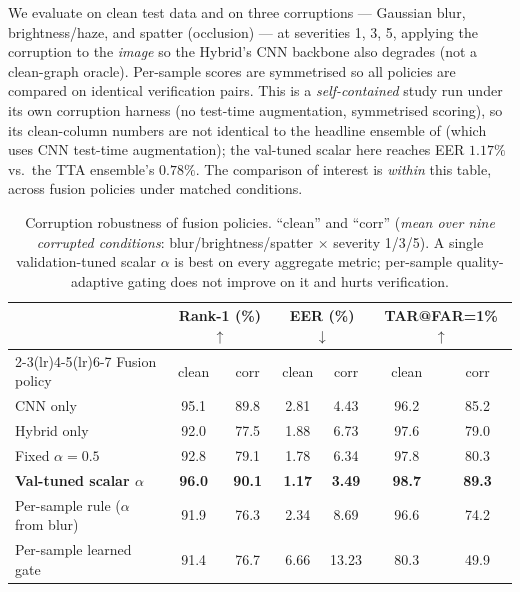 \documentclass[11pt]{article}
\begin{document}
We evaluate on clean test data and on three corruptions --- Gaussian blur,
brightness/haze, and spatter (occlusion) --- at severities 1, 3, 5, applying the corruption
to the \emph{image} so the Hybrid's CNN backbone also degrades (not a clean-graph oracle).
Per-sample scores are symmetrised so all policies are compared on identical verification
pairs. This is a \emph{self-contained} study run under its own corruption harness (no
test-time augmentation, symmetrised scoring), so its clean-column numbers are not identical
to the headline ensemble of  (which uses CNN test-time augmentation); the
val-tuned scalar here reaches EER $1.17\%$ vs.\ the TTA ensemble's $0.78\%$. The comparison
of interest is \emph{within} this table, across fusion policies under matched conditions.

\begin{table}[t]
  \centering
  \caption{Corruption robustness of fusion policies. ``clean'' and ``corr''
  (\emph{mean over nine corrupted conditions}: blur/brightness/spatter $\times$ severity
  1/3/5). A single validation-tuned scalar $\alpha$ is best on every aggregate metric;
  per-sample quality-adaptive gating does not improve on it and hurts verification.}
  \label{tab:corrupt}
  \small
  \begin{tabular}{lcccccc}
    \toprule
    & \multicolumn{2}{c}{Rank-1 (\%) $\uparrow$} & \multicolumn{2}{c}{EER (\%) $\downarrow$} & \multicolumn{2}{c}{TAR@FAR=1\% $\uparrow$} \\
    \cmidrule(lr){2-3}\cmidrule(lr){4-5}\cmidrule(lr){6-7}
    Fusion policy & clean & corr & clean & corr & clean & corr \\
    \midrule
    CNN only                       & 95.1 & 89.8 & 2.81 & 4.43 & 96.2 & 85.2 \\
    Hybrid only                    & 92.0 & 77.5 & 1.88 & 6.73 & 97.6 & 79.0 \\
    Fixed $\alpha{=}0.5$           & 92.8 & 79.1 & 1.78 & 6.34 & 97.8 & 80.3 \\
    \textbf{Val-tuned scalar $\alpha$} & \textbf{96.0} & \textbf{90.1} & \textbf{1.17} & \textbf{3.49} & \textbf{98.7} & \textbf{89.3} \\
    Per-sample rule ($\alpha$ from blur)      & 91.9 & 76.3 & 2.34 & 8.69 & 96.6 & 74.2 \\
    Per-sample learned gate        & 91.4 & 76.7 & 6.66 & 13.23 & 80.3 & 49.9 \\
    \bottomrule
  \end{tabular}
\end{table}
\end{document}
